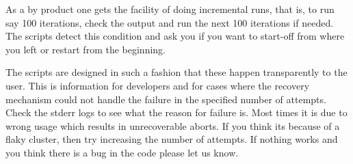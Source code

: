 \begin{DoxyEnumerate}
\begin{DoxyEnumerate}
As a by product one gets the facility of doing incremental runs, that is, to run say 100 iterations, check the output and run the next 100 iterations if needed. The scripts detect this condition and ask you if you want to start-\/off from where you left or restart from the beginning. 

The scripts are designed in such a fashion that these happen transparently to the user. This is information for developers and for cases where the recovery mechanism could not handle the failure in the specified number of attempts. Check the stderr logs to see what the reason for failure is. Most times it is due to wrong usage which results in unrecoverable aborts. If you think its because of a flaky cluster, then try increasing the number of attempts. If nothing works and you think there is a bug in the code please let us know. 
\end{DoxyEnumerate}
\end{DoxyEnumerate}
